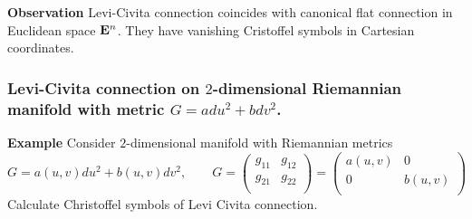 \documentclass[12pt]{article}
\theoremstyle{theorem}
\numberwithin{equation}{section}
\begin{document}
{\bf Observation} Levi-Civita connection coincides with canonical flat connection
in Euclidean space ${\bf E}^n$. They have
 vanishing Cristoffel symbols in Cartesian coordinates.


\subsubsection {Levi-Civita connection on $2$-dimensional Riemannian
manifold with metric $G=adu^2+bdv^2$.}

{\bf Example} Consider $2$-dimensional manifold with Riemannian metrics
                  $$
                  G=a(u,v)du^2+b(u,v)dv^2, \qquad
                  G=\begin{pmatrix}
                       g_{11} &g_{12}\\
                       g_{21}  &g_{22}\\
                     \end{pmatrix}=
         \begin{pmatrix}
                       a(u,v) &0\\
                       0  &b(u,v)\\
                     \end{pmatrix}
                  $$
Calculate Christoffel symbols of Levi Civita connection.
\end{document}
